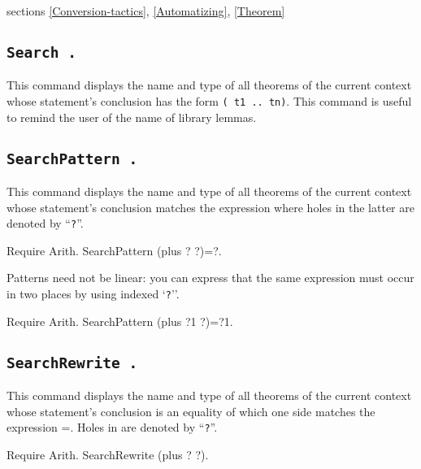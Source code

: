 \SeeAlso sections \ref{Conversion-tactics}, \ref{Automatizing},
\ref{Theorem}

\subsection{\tt Search {\qualid}.}
This command displays the name and type of all theorems of the current
context whose statement's conclusion has the form {\tt ({\qualid} t1 ..
  tn)}.  This command is useful to remind the user of the name of
library lemmas.

\subsection{\tt SearchPattern {\term}.}

This command displays the name and type of all theorems of the current
context whose statement's conclusion matches the expression {\term}
where holes in the latter are denoted by ``{\texttt ?}''.

\begin{coq_example}
Require Arith.
SearchPattern (plus ? ?)=?.
\end{coq_example}

Patterns need not be linear: you can express that the same
expression must occur in two places by using indexed `{\texttt ?}''.

\begin{coq_example}
Require Arith.
SearchPattern (plus ?1 ?)=?1.
\end{coq_example}

\subsection{\tt SearchRewrite {\term}.}

This command displays the name and type of all theorems of the current
context whose statement's conclusion is an equality of which one side matches
the expression {\term =}. Holes in {\term} are denoted by ``{\texttt ?}''.

\begin{coq_example}
Require Arith.
SearchRewrite (plus ? ?).
\end{coq_example}

